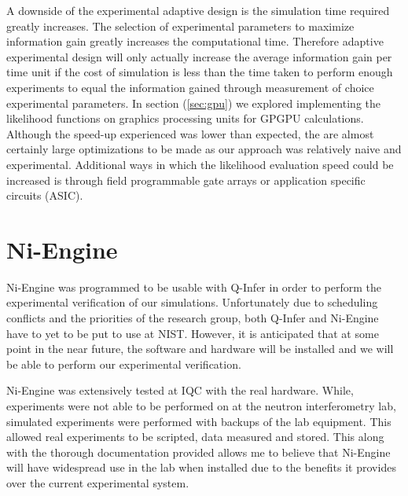 A downside of the experimental adaptive design is the simulation time required greatly increases. The selection of experimental parameters to maximize information gain greatly increases the computational time. Therefore adaptive experimental design will only actually increase the average information gain per time unit if the cost of simulation is less than the time taken to perform enough experiments to equal the information gained through measurement of choice experimental parameters. In section (\ref{sec:gpu}) we explored implementing the likelihood functions on graphics processing units for GPGPU calculations. Although the speed-up experienced was lower than expected, the are almost certainly large optimizations to be made as our approach was relatively naive and experimental. Additional ways in which the likelihood evaluation speed could be increased is through field programmable gate arrays or application specific circuits (ASIC). 

\section{Ni-Engine}
Ni-Engine was programmed to be usable with Q-Infer in order to perform the experimental verification of our simulations. Unfortunately due to scheduling conflicts and the priorities of the research group, both Q-Infer and Ni-Engine have to yet to be put to use at NIST. However, it is anticipated that at some point in the near future, the software and hardware will be installed and we will be able to perform our experimental verification. 

Ni-Engine was extensively tested at IQC with the real hardware. While, experiments were not able to be performed on at the neutron interferometry lab, simulated experiments were performed with backups of the lab equipment. This allowed real experiments to be scripted, data measured and stored. This along with the thorough documentation provided allows me to believe that Ni-Engine will have widespread use in the lab when installed due to the benefits it provides over the current experimental system. 

